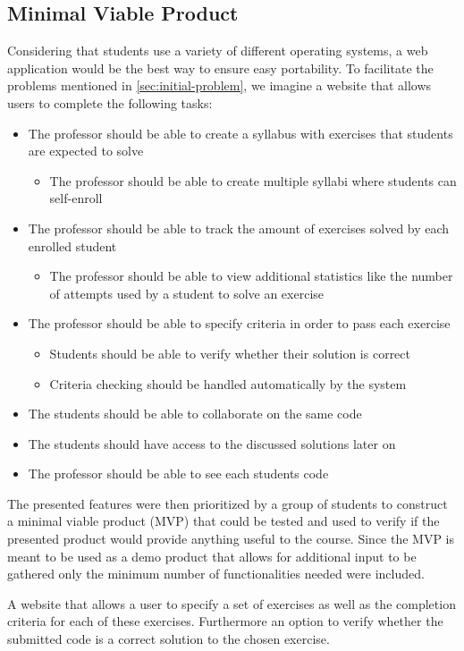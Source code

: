 \subsection{Minimal Viable Product}
Considering that students use a variety of different operating systems, a web application would be the best way to ensure easy portability.
To facilitate the problems mentioned in \ref{sec:initial-problem}, we imagine a website that allows users to complete the following tasks:
\begin{itemize}
	\item The professor should be able to create a syllabus with exercises that students are expected to solve
	\begin{itemize}
		\item The professor should be able to create multiple syllabi where students can self-enroll
	\end{itemize}
	\item The professor should be able to track the amount of exercises solved by each enrolled student
	\begin{itemize}
		\item The professor should be able to view additional statistics like the number of attempts used by a student to solve an exercise
	\end{itemize}
	\item The professor should be able to specify criteria in order to pass each exercise 
	\begin{itemize}
		\item Students should be able to verify whether their solution is correct
		\item Criteria checking should be handled automatically by the system
	\end{itemize}
	\item The students should be able to collaborate on the same code
	\item The students should have access to the discussed solutions later on
	\item The professor should be able to see each students code
\end{itemize}

The presented features were then prioritized by a group of students to construct a minimal viable product (MVP) that could be tested and used to verify if the presented product would provide anything useful to the course. Since the MVP is meant to be used as a demo product that allows for additional input to be gathered only the minimum number of functionalities needed were included.

\begin{displayquote}
A website that allows a user to specify a set of exercises as well as the completion criteria for each of these exercises. Furthermore an option to verify whether the submitted code is a correct solution to the chosen exercise.
\end{displayquote}





